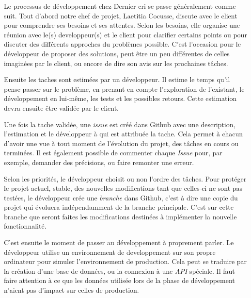 \documentclass[12pt,a4paper]{article}
\begin{document}
  \bigskip

  Le processus de développement chez Dernier cri se passe généralement
  comme suit. Tout d'abord notre chef de projet, Laetitia Cocusse, discute
  avec le client pour comprendre ses besoins et ses attentes. Selon les
  besoins, elle organise une réunion avec le(s) developpeur(s) et le
  client pour clarifier certains points ou pour discuter des différents
  approches du problèmes possible. C'est l'occasion pour le développeur de
  proposer des solutions, peut être un peu différentes de celles imaginées
  par le client, ou encore de dire son avis sur les prochaines tâches.

  \bigskip

  Ensuite les taches sont estimées par un développeur. Il estime le temps
  qu'il pense passer sur le problème, en prenant en compte l'exploration
  de l'existant, le développement en lui-même, les tests et les possibles
  retours. Cette estimation devra ensuite être validée par le client.

  \bigskip

  Une fois la tache validée, une \emph{issue} est créé dans Github avec
  une description, l'estimation et le développeur à qui est attribuée la
  tache. Cela permet à chacun d'avoir une vue à tout moment de l'évolution
  du projet, des tâches en cours ou terminées. Il est également possible
  de commenter chaque \emph{Issue} pour, par exemple, demander des
  précisions, ou faire remonter une erreur.

  \bigskip

  Selon les priorités, le développeur choisit ou non l'ordre des tâches.
  Pour protéger le projet actuel, stable, des nouvelles modifications tant
  que celles-ci ne sont pas testées, le développeur crée une
  \emph{branche} dans Github, c'est à dire une copie du projet qui
  évoluera indépendamment de la branche principale. C'est sur cette
  branche que seront faites les modifications destinées à implémenter la
  nouvelle fonctionnalité.

  \bigskip

  C'est ensuite le moment de passer au développement à proprement parler.
  Le développeur utilise un environnement de developpement sur son propre
  ordinateur pour simuler l'environnement de production. Cela peut se
  traduire par la création d'une base de données, ou la connexion à une
  \emph{API} spéciale. Il faut faire attention à ce que les données
  utilisée lors de la phase de développement n'aient pas d'impact sur
  celles de production.
\end{document}
